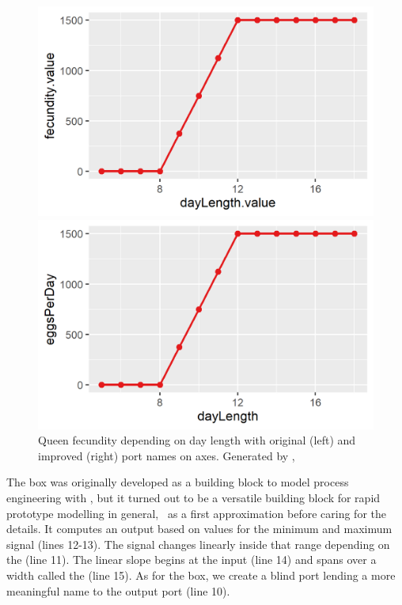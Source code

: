 \begin{figure} [b]
  \centering
  \begin{minipage}[b]{0.45\textwidth}
    \includegraphics[width=\textwidth]{graphics/honeybee1-1}
  \end{minipage}
  \begin{minipage}[b]{0.45\textwidth}
    \includegraphics[width=\textwidth]{graphics/honeybee1-2}
  \end{minipage}
  \caption{Queen fecundity depending on day length with original (left) and improved (right) port names on axes. Generated by ,}
  \label{fig:honeybee1}
\end{figure}


The  box was originally developed as a building block to model process engineering with \US, but it turned out to be a versatile building block for rapid prototype modelling in general, \ie\ as a first approximation before caring for the details. It computes an output  based on values for the minimum and maximum signal (lines 12-13). The signal changes linearly inside that range depending on the  (line 11). The linear slope begins at the input  (line 14) and spans over a width called the  (line 15). As for the  box, we create a blind port lending a more meaningful name  to the  output port (line 10).


